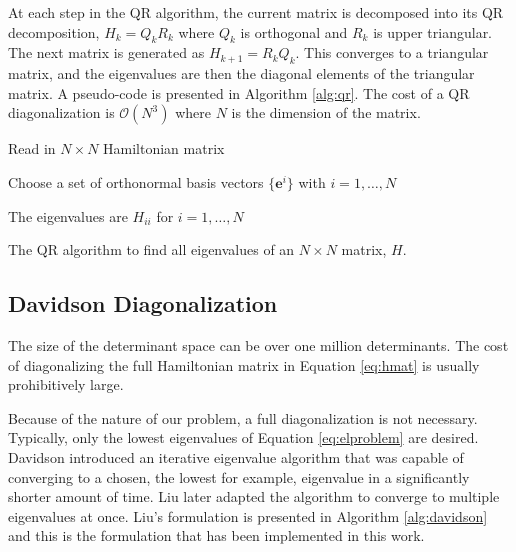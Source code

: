 \documentclass[final,3p,times,twocolumn]{elsarticle}
\begin{document}
At each step in the QR algorithm, the current matrix is decomposed into its QR decomposition, $H_k = Q_kR_k$ where $Q_k$ is orthogonal and $R_k$ is upper triangular. The next matrix is generated as $H_{k+1} = R_kQ_k$. This converges to a triangular matrix, and the eigenvalues are then the diagonal elements of the triangular matrix. A pseudo-code is presented in Algorithm \ref{alg:qr}. The cost of a QR diagonalization is $\mathcal O(N^3)$ where $N$ is the dimension of the matrix.

\begin{algorithm}
 Read in $N \times N$ Hamiltonian matrix\;
 
 Choose a set of orthonormal basis vectors $\{\mathbf{e}^i\}$ with $i = 1,  \ldots, N$\;
 
 The eigenvalues are $H_{ii}$ for $i = 1, \ldots, N$\;
\caption{The QR algorithm to find all eigenvalues of an $N 
\times N$ matrix, $H$.} 
\label{alg:qr}
\end{algorithm}

\subsection{Davidson Diagonalization} \label{sec:davidson}
The size of the determinant space can be over one million determinants. The cost of diagonalizing the full Hamiltonian matrix in Equation \eqref{eq:hmat} is usually prohibitively large. %

Because of the nature of our problem, a full diagonalization is not necessary. Typically, only the lowest eigenvalues of Equation \eqref{eq:elproblem} are desired. Davidson introduced an iterative eigenvalue algorithm that was capable of converging to a chosen, the lowest for example, eigenvalue in a significantly shorter amount of time.\cite{davidson} Liu later adapted the algorithm to converge to multiple eigenvalues at once.\cite{liu} Liu's formulation is presented in Algorithm \ref{alg:davidson} and this is the formulation that has been implemented in this work.
\end{document}
